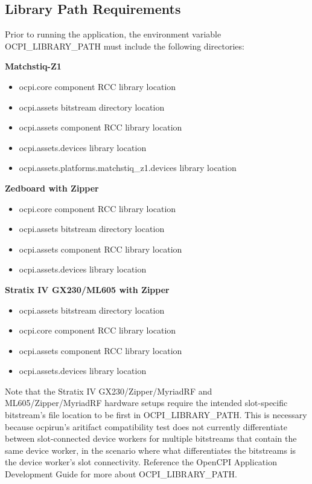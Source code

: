 \pagebreak
\subsection{Library Path Requirements}
\noindent Prior to running the application, the environment variable OCPI\_LIBRARY\_PATH must include the following directories:\par\medskip
	\textbf{Matchstiq-Z1}
	\begin{itemize}
		\item ocpi.core component RCC library location
		\item ocpi.assets bitstream directory location
		\item ocpi.assets component RCC library location
		\item ocpi.assets.devices library location
		\item ocpi.assets.platforms.matchstiq\_z1.devices library location
	\end{itemize}
	\textbf{Zedboard with Zipper}
	\begin{itemize}
		\item ocpi.core component RCC library location
		\item ocpi.assets bitstream directory location
		\item ocpi.assets component RCC library location
		\item ocpi.assets.devices library location
	\end{itemize}
	\textbf{Stratix IV GX230/ML605 with Zipper}
	\begin{itemize}
		\item ocpi.assets bitstream directory location
		\item ocpi.core component RCC library location
		\item ocpi.assets component RCC library location
		\item ocpi.assets.devices library location
	\end{itemize}

\noindent Note that the Stratix IV GX230/Zipper/MyriadRF and ML605/Zipper/MyriadRF hardware setups require the intended slot-specific bitstream's file location to be first in OCPI\_LIBRARY\_PATH. This is necessary because ocpirun's aritifact compatibility test does not currently differentiate between slot-connected device workers for multiple bitstreams that contain the same device worker, in the scenario where what differentiates the bitstreams is the device worker's slot connectivity. Reference the OpenCPI Application Development Guide for more about OCPI\_LIBRARY\_PATH. \par\medskip
\pagebreak

